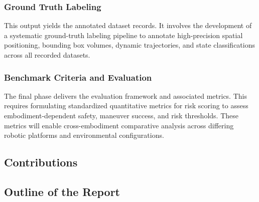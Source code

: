 \subsubsection{Ground Truth Labeling}
This output yields the annotated dataset records. It involves the development of a systematic ground-truth labeling pipeline to annotate high-precision spatial positioning, bounding box volumes, dynamic trajectories, and state classifications across all recorded datasets.

\subsubsection{Benchmark Criteria and Evaluation}
The final phase delivers the evaluation framework and associated metrics. This requires formulating standardized quantitative metrics for risk scoring to assess embodiment-dependent safety, maneuver success, and risk thresholds. These metrics will enable cross-embodiment comparative analysis across differing robotic platforms and environmental configurations.

\subsection{Contributions}

\subsection{Outline of the Report}
